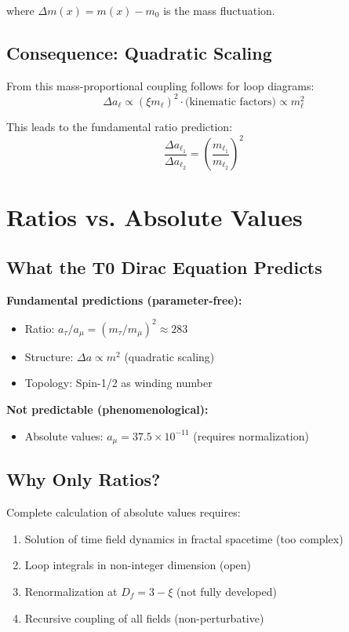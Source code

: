 	where $\Delta m(x) = m(x) - m_0$ is the mass fluctuation.
	
	\subsection{Consequence: Quadratic Scaling}
	
	From this mass-proportional coupling follows for loop diagrams:
	\begin{equation}
		\Delta a_\ell \propto (\xi m_\ell)^2 \cdot \text{(kinematic factors)} \propto m_\ell^2
		\label{eq:quadratic_scaling}
	\end{equation}
	
	This leads to the fundamental ratio prediction:
	\begin{equation}
		\boxed{\frac{\Delta a_{\ell_1}}{\Delta a_{\ell_2}} = \left(\frac{m_{\ell_1}}{m_{\ell_2}}\right)^2}
		\label{eq:ratio_prediction}
	\end{equation}
	
	\section{Ratios vs. Absolute Values}
	
	\subsection{What the T0 Dirac Equation Predicts}
	
	\textbf{Fundamental predictions (parameter-free):}
	\begin{itemize}
		\item Ratio: $a_\tau/a_\mu = (m_\tau/m_\mu)^2 \approx 283$
		\item Structure: $\Delta a \propto m^2$ (quadratic scaling)
		\item Topology: Spin-1/2 as winding number
	\end{itemize}
	
	\textbf{Not predictable (phenomenological):}
	\begin{itemize}
		\item Absolute values: $a_\mu = 37.5 \times 10^{-11}$ (requires normalization)
	\end{itemize}
	
	\subsection{Why Only Ratios?}
	
	Complete calculation of absolute values requires:
	\begin{enumerate}
		\item Solution of time field dynamics in fractal spacetime (too complex)
		\item Loop integrals in non-integer dimension (open)
		\item Renormalization at $D_f = 3 - \xi$ (not fully developed)
		\item Recursive coupling of all fields (non-perturbative)
	\end{enumerate}
	
